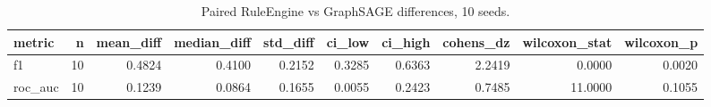 \begin{table}[htbp]
\centering
\caption{Paired RuleEngine vs GraphSAGE differences, 10 seeds.}
\label{tab:significance}
\begin{tabular}{lrrrrrrrrr}
\hline
metric & n & mean_diff & median_diff & std_diff & ci_low & ci_high & cohens_dz & wilcoxon_stat & wilcoxon_p \\
\hline
f1 & 10 & 0.4824 & 0.4100 & 0.2152 & 0.3285 & 0.6363 & 2.2419 & 0.0000 & 0.0020 \\
roc_auc & 10 & 0.1239 & 0.0864 & 0.1655 & 0.0055 & 0.2423 & 0.7485 & 11.0000 & 0.1055 \\
\hline
\end{tabular}
\end{table}
